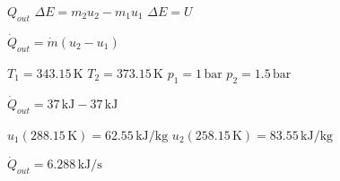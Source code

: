 \( Q_{out} \)  
\( \Delta E = m_2 u_2 - m_1 u_1 \)  
\( \Delta E = U \)  

\( \dot{Q}_{out} = \dot{m} (u_2 - u_1) \)  

\( T_1 = 343.15 \, \text{K} \)  
\( T_2 = 373.15 \, \text{K} \)  
\( p_1 = 1 \, \text{bar} \)  
\( p_2 = 1.5 \, \text{bar} \)  

\( \dot{Q}_{out} = 37 \, \text{kJ} - 37 \, \text{kJ} \)  

\( u_1 (288.15 \, \text{K}) = 62.55 \, \text{kJ/kg} \)  
\( u_2 (258.15 \, \text{K}) = 83.55 \, \text{kJ/kg} \)  

\( \dot{Q}_{out} = 6.288 \, \text{kJ/s} \)